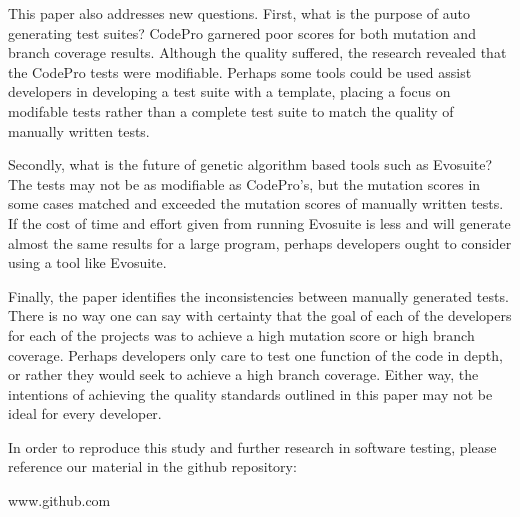 \documentclass[conference]{IEEEtran}
\begin{document}
This paper also addresses new questions. First, what is the purpose of auto generating test suites? CodePro garnered poor scores for both mutation and branch coverage results. Although the quality suffered, the research revealed that the CodePro tests were modifiable. Perhaps some tools could be used assist developers in developing a test suite with a template, placing a focus on modifable tests rather than a complete test suite to match the quality of manually written tests.

Secondly, what is the future of genetic algorithm based tools such as Evosuite? The tests may not be as modifiable as CodePro's, but the mutation scores in some cases matched and exceeded the mutation scores of manually written tests. If the cost of time and effort given from running Evosuite is less and will generate almost the same results for a large program, perhaps developers ought to consider using a tool like Evosuite.

Finally, the paper identifies the inconsistencies between manually generated tests. There is no way one can say with certainty that the goal of each of the developers for each of the projects was to achieve a high mutation score or high branch coverage. Perhaps developers only care to test one function of the code in depth, or rather they would seek to achieve a high branch coverage. Either way, the intentions of achieving the quality standards outlined in this paper may not be ideal for every developer. 

In order to reproduce this study and further research in software testing, please reference our material in the github repository:

www.github.com






\end{document}

